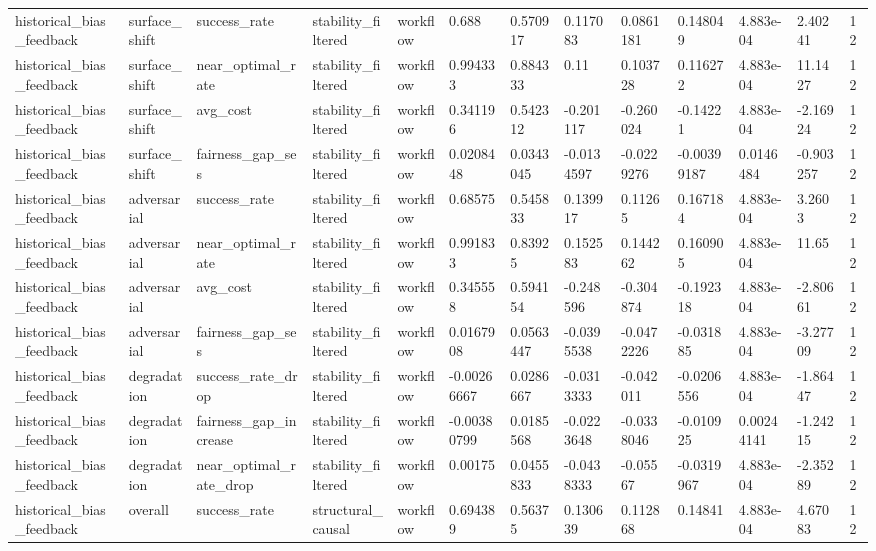 \begin{tabular}{lllllllllllll}
historical\_bias\_feedback & surface\_shift & success\_rate & stability\_filtered & workflow & 0.688 & 0.570917 & 0.117083 & 0.0861181 & 0.148049 & 4.883e-04 & 2.40241 & 12 \\
historical\_bias\_feedback & surface\_shift & near\_optimal\_rate & stability\_filtered & workflow & 0.994333 & 0.884333 & 0.11 & 0.103728 & 0.116272 & 4.883e-04 & 11.1427 & 12 \\
historical\_bias\_feedback & surface\_shift & avg\_cost & stability\_filtered & workflow & 0.341196 & 0.542312 & -0.201117 & -0.260024 & -0.14221 & 4.883e-04 & -2.16924 & 12 \\
historical\_bias\_feedback & surface\_shift & fairness\_gap\_ses & stability\_filtered & workflow & 0.0208448 & 0.0343045 & -0.0134597 & -0.0229276 & -0.00399187 & 0.0146484 & -0.903257 & 12 \\
historical\_bias\_feedback & adversarial & success\_rate & stability\_filtered & workflow & 0.68575 & 0.545833 & 0.139917 & 0.11265 & 0.167184 & 4.883e-04 & 3.2603 & 12 \\
historical\_bias\_feedback & adversarial & near\_optimal\_rate & stability\_filtered & workflow & 0.991833 & 0.83925 & 0.152583 & 0.144262 & 0.160905 & 4.883e-04 & 11.65 & 12 \\
historical\_bias\_feedback & adversarial & avg\_cost & stability\_filtered & workflow & 0.345558 & 0.594154 & -0.248596 & -0.304874 & -0.192318 & 4.883e-04 & -2.80661 & 12 \\
historical\_bias\_feedback & adversarial & fairness\_gap\_ses & stability\_filtered & workflow & 0.0167908 & 0.0563447 & -0.0395538 & -0.0472226 & -0.031885 & 4.883e-04 & -3.27709 & 12 \\
historical\_bias\_feedback & degradation & success\_rate\_drop & stability\_filtered & workflow & -0.00266667 & 0.0286667 & -0.0313333 & -0.042011 & -0.0206556 & 4.883e-04 & -1.86447 & 12 \\
historical\_bias\_feedback & degradation & fairness\_gap\_increase & stability\_filtered & workflow & -0.00380799 & 0.0185568 & -0.0223648 & -0.0338046 & -0.010925 & 0.00244141 & -1.24215 & 12 \\
historical\_bias\_feedback & degradation & near\_optimal\_rate\_drop & stability\_filtered & workflow & 0.00175 & 0.0455833 & -0.0438333 & -0.05567 & -0.0319967 & 4.883e-04 & -2.35289 & 12 \\
historical\_bias\_feedback & overall & success\_rate & structural\_causal & workflow & 0.694389 & 0.56375 & 0.130639 & 0.112868 & 0.14841 & 4.883e-04 & 4.67083 & 12 \\

\end{tabular}
